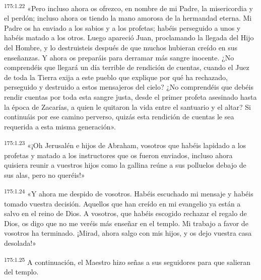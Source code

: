 \par 
\textsuperscript{175:1.22} «Pero incluso ahora os ofrezco, en nombre de mi Padre, la misericordia y el perdón; incluso ahora os tiendo la mano amorosa de la hermandad eterna. Mi Padre os ha enviado a los sabios y a los profetas; habéis perseguido a unos y habéis matado a los otros. Luego apareció Juan, proclamando la llegada del Hijo del Hombre, y lo destruisteis después de que muchos hubieran creído en sus enseñanzas. Y ahora os preparáis para derramar más sangre inocente. ¿No comprendéis que llegará un día terrible de rendición de cuentas, cuando el Juez de toda la Tierra exija a este pueblo que explique por qué ha rechazado, perseguido y destruido a estos mensajeros del cielo? ¿No comprendéis que debéis rendir cuentas por toda esta sangre justa, desde el primer profeta asesinado hasta la época de Zacarías, a quien le quitaron la vida entre el santuario y el altar? Si continuáis por ese camino perverso, quizás esta rendición de cuentas le sea requerida a esta misma generación».

\par 
\textsuperscript{175:1.23} «¡Oh Jerusalén e hijos de Abraham, vosotros que habéis lapidado a los profetas y matado a los instructores que os fueron enviados, incluso ahora quisiera reunir a vuestros hijos como la gallina reúne a sus polluelos debajo de sus alas, pero no queréis!»

\par 
\textsuperscript{175:1.24} «Y ahora me despido de vosotros. Habéis escuchado mi mensaje y habéis tomado vuestra decisión. Aquellos que han creído en mi evangelio ya están a salvo en el reino de Dios. A vosotros, que habéis escogido rechazar el regalo de Dios, os digo que no me veréis más enseñar en el templo. Mi trabajo a favor de vosotros ha terminado. ¡Mirad, ahora salgo con mis hijos, y os dejo vuestra casa desolada!»

\par 
\textsuperscript{175:1.25} A continuación, el Maestro hizo señas a sus seguidores para que salieran del templo.


